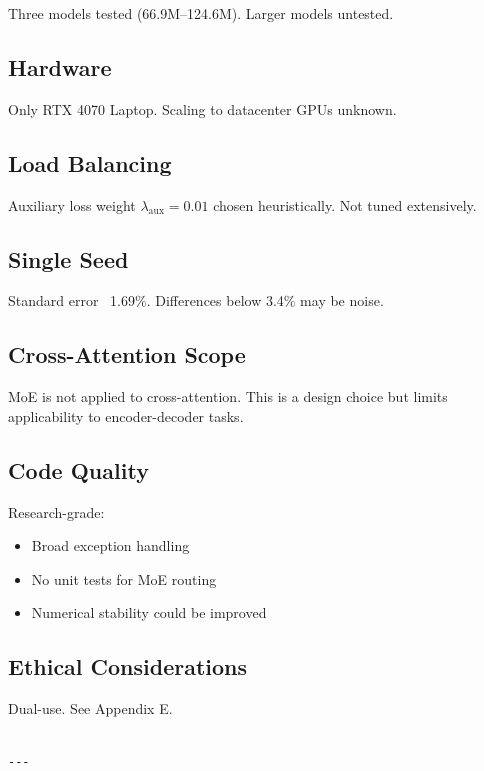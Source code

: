 Three models tested (66.9M--124.6M). Larger models untested.

\subsection{Hardware}

Only RTX 4070 Laptop. Scaling to datacenter GPUs unknown.

\subsection{Load Balancing}

Auxiliary loss weight $\lambda_\text{aux} = 0.01$ chosen 
heuristically. Not tuned extensively.

\subsection{Single Seed}

Standard error ~1.69\%. Differences below 3.4\% may be noise.

\subsection{Cross-Attention Scope}

MoE is not applied to cross-attention. This is a design choice but 
limits applicability to encoder-decoder tasks.

\subsection{Code Quality}

Research-grade:
\begin{itemize}
\item Broad exception handling
\item No unit tests for MoE routing
\item Numerical stability could be improved

\end{itemize}
\subsection{Ethical Considerations}

Dual-use. See Appendix E.
\begin{lstlisting}

---
\end{lstlisting}

